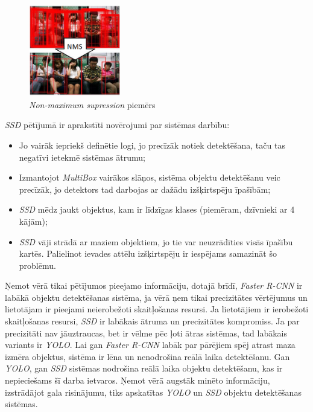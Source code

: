 \begin{figure}[H]%
	\centering
	\includegraphics[height=4cm]{images/nms.png} %
	\caption{\textit{Non-maximum supression} piemērs \cite{liu2016ssd}}%
	\label{fig:example}%
\end{figure}

\textit{SSD} pētījumā \cite{liu2016ssd} ir aprakstīti novērojumi par sistēmas darbību:
\begin{itemize}
	\item Jo vairāk iepriekš definētie logi, jo precīzāk notiek detektēšana, taču tas negatīvi ietekmē sistēmas ātrumu;
	\item Izmantojot \textit{MultiBox} vairākos slāņos, sistēma objektu detektēšanu veic precīzāk, jo detektors tad darbojas ar dažādu izšķirtspēju īpašībām;
	\item \textit{SSD} mēdz jaukt objektus, kam ir līdzīgas klases (piemēram, dzīvnieki ar 4 kājām);
	\item \textit{SSD} vāji strādā ar maziem objektiem, jo tie var neuzrādīties visās īpašību kartēs. Palielinot ievades attēlu izšķirtspēju ir iespējams samazināt šo problēmu.
\end{itemize}

Ņemot vērā tikai pētījumos \cite{redmon2016you,ren2015faster,liu2016ssd} pieejamo informāciju, dotajā brīdī, \textit{Faster R-CNN} ir labākā objektu detektēšanas sistēma, ja vērā ņem tikai precizitātes vērtējumus un lietotājam ir pieejami neierobežoti skaitļošanas resursi. Ja lietotājiem ir ierobežoti skaitļošanas resursi, \textit{SSD} ir labākais ātruma un precizitātes kompromiss. Ja par precizitāti nav jāuztraucas, bet ir vēlme pēc ļoti ātras sistēmas, tad labākais variants ir \textit{YOLO}. Lai gan \textit{Faster R-CNN} labāk par pārējiem spēj atrast maza izmēra objektus, sistēma ir lēna un nenodrošina reālā laika detektēšanu. Gan \textit{YOLO}, gan \textit{SSD} sistēmas nodrošina reālā laika objektu detektēšanu, kas ir nepieciešams šī darba ietvaros. Ņemot vērā augstāk minēto informāciju, izstrādājot gala risinājumu, tiks apskatītas \textit{YOLO} un \textit{SSD} objektu detektēšanas sistēmas. 

